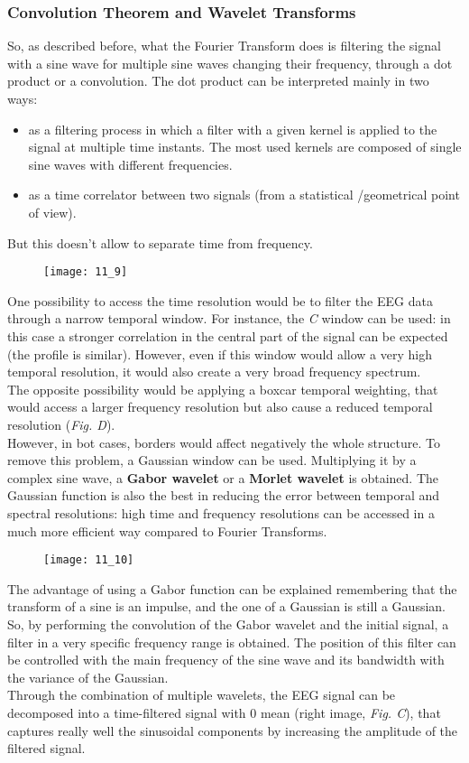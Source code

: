 \subsubsection{Convolution Theorem and Wavelet Transforms}
So, as described before, what the Fourier Transform does is filtering the signal with a sine wave for multiple sine waves changing their frequency, through a dot product or a convolution. The dot product can be interpreted mainly in two ways:
\begin{itemize}
    \item as a filtering process in which a filter with a given kernel is applied to the signal at multiple time instants. The most used kernels are composed of single sine waves with different frequencies.
    \item as a time correlator between two signals (from a statistical /geometrical point of view).
\end{itemize} 
But this doesn't allow to separate time from frequency.
\begin{figure}[H]
    \texttt{[image: 11\_9]}
    \centering
\end{figure}
One possibility to access the time resolution would be to filter the EEG data through a narrow temporal window. For instance, the \textit{C} window can be used: in this case a stronger correlation in the central part of the signal can be expected (the profile is similar). However, even if this window would allow a very high temporal resolution, it would also create a very broad frequency spectrum.\\
The opposite possibility would be applying a boxcar temporal weighting, that would access a larger frequency resolution but also cause a reduced temporal resolution (\textit{Fig. D}).\\
However, in bot cases, borders would affect negatively the whole structure. To remove this problem, a Gaussian window can be used. Multiplying it by a complex sine wave, a \textbf{Gabor wavelet} or a \textbf{Morlet wavelet} is obtained. The Gaussian function is also the best in reducing the error between temporal and spectral resolutions: high time and frequency resolutions can be accessed in a much more efficient way compared to Fourier Transforms.
\begin{figure}[H]
    \texttt{[image: 11\_10]}
    \centering
\end{figure}
The advantage of using a Gabor function can be explained remembering that the transform of a sine is an impulse, and the one of a Gaussian is still a Gaussian. So, by performing the convolution of the Gabor wavelet and the initial signal, a filter in a very specific frequency range is obtained. The position of this filter can be controlled with the main frequency of the sine wave and its bandwidth with the variance of the Gaussian.\\
Through the combination of multiple wavelets, the EEG signal can be decomposed into a time-filtered signal with 0 mean (right image, \textit{Fig. C}), that captures really well the sinusoidal components by increasing the amplitude of the filtered signal. 

